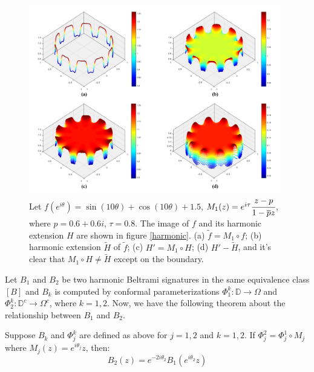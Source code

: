 \documentclass[review,onefignum,onetabnum]{siamonline190516}
\begin{document}
    \begin{figure}
        \begin{center}
            \includegraphics[width=11cm]{harmonic_extension_not_rotation.png}
        \end{center}
        \caption{Let $f(e^{i \theta}) = \sin(10 \theta) + \cos(10 \theta)+1.5$, $M_1(z) = e^{i \tau}\cfrac{z-p}{1-\overline{p}z}$, where $p=0.6+0.6i$, $\tau = 0.8$. The image of $f$ and its harmonic extension $H$ are shown in figure \ref{harmonic}. (a) $\tilde{f} = M_1 \circ f$; (b) harmonic extension $\tilde{H}$ of $\tilde{f}$; (c) $H' = M_1 \circ H$; (d) $H' - \tilde{H}$, and it's clear that $M_1 \circ H \neq \tilde{H}$ except on the boundary.}
        \label{harmonic extension not rotation}
    \end{figure}

    Let $B_1$ and $B_2$ be two harmonic Beltrami signatures in the same equivalence class $[B]$ and $B_k$ is computed by conformal parameterizations $\Phi_1^k:\mathbb{D}\to \Omega$ and $\Phi_2^k:\mathbb{D}^c\to \Omega^c$, where $k=1,2$. Now, we have the following theorem about the relationship between $B_1$ and $B_2$.
            
    \begin{theorem}\label{b1 b2 relationship}
        Suppose $B_k$ and $\Phi_j^k$ are defined as above for $j = 1, 2$ and $k=1,2$. If $\Phi_j^2 = \Phi_j^1\circ M_j$ where $M_j(z) = e^{i\theta_j}z$, then:
        \begin{equation}
          B_2(z) = e^{-2i\theta_2} B_1(e^{i\theta_2}z)  
        \end{equation}
    \end{theorem}
\end{document}
